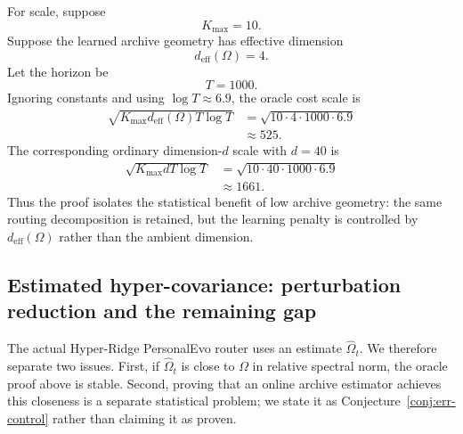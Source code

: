 \documentclass{article} %
\begin{document}
For scale, suppose
\begin{equation}
\label{eq:hyper-oracle-example-k}
K_{\max}=10 .
\end{equation}
Suppose the learned archive geometry has effective dimension
\begin{equation}
\label{eq:hyper-oracle-example-deff}
d_{\mathrm{eff}}(\Omega)=4 .
\end{equation}
Let the horizon be
\begin{equation}
\label{eq:hyper-oracle-example-T}
T=1000 .
\end{equation}
Ignoring constants and using \(\log T\approx 6.9\), the oracle cost scale is
\begin{align}
\label{eq:hyper-oracle-example-cost}
\sqrt{K_{\max}d_{\mathrm{eff}}(\Omega)T\log T}
&=
\sqrt{10\cdot 4\cdot 1000\cdot 6.9}
\\
&\approx
525 .
\end{align}
The corresponding ordinary dimension-\(d\) scale with \(d=40\) is
\begin{align}
\label{eq:hyper-oracle-example-cost-d}
\sqrt{K_{\max}dT\log T}
&=
\sqrt{10\cdot 40\cdot 1000\cdot 6.9}
\\
&\approx
1661 .
\end{align}
Thus the proof isolates the statistical benefit of low archive geometry: the same routing decomposition is retained, but the learning penalty is controlled by \(d_{\mathrm{eff}}(\Omega)\) rather than the ambient dimension.

\subsection{Estimated hyper-covariance: perturbation reduction and the remaining gap}
\label{sec:theory-estimated-hyper}

The actual Hyper-Ridge PersonalEvo router uses an estimate \(\widehat{\Omega}_t\).  We therefore separate two issues.  First, if \(\widehat{\Omega}_t\) is close to \(\Omega\) in relative spectral norm, the oracle proof above is stable.  Second, proving that an online archive estimator achieves this closeness is a separate statistical problem; we state it as Conjecture~\ref{conj:err-control} rather than claiming it as proven.
\end{document}
